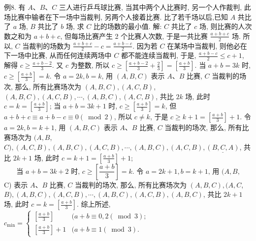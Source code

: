 例8. 有 $A 、 B 、 C$ 三人进行乒乓球比赛, 当其中两个人比赛时, 另一个人作裁判, 此场比赛中输者在下一场中当裁判, 另两个人接着比赛.
比了若千场以后,已知 $A$ 共比了 $a$ 场, $B$ 共比了 $b$ 场, 求 $C$ 比的场数的最小值.
解: $C$ 共比了 $c$ 场, 则比赛的人次数之和为 $a+b+c$, 但每场比赛产生 2 个比赛人次数, 于是一共比赛 $\frac{a+b+c}{2}$ 场.
所以, $C$ 当裁判的场数为 $\frac{a+b+c}{2}-c=\frac{a+b-c}{2}$.
因为若 $C$ 在某场中当裁判, 则他必在下一场中比赛, 从而任何连续两场中 $C$ 都不能连续当裁判, 于是, $\frac{a+b-c}{2} \leqslant c+1$, 解得 $c \geqslant \frac{a+b-2}{3}$.
又 $c$ 为整数, 所以 $c \geqslant\left[\frac{a+b-2}{3}+\frac{2}{3}\right]=\left[\frac{a+b}{3}\right]$.
当 $a+b=3 k$ 时, $c \geqslant\left[\frac{a+b}{3}\right]=k$. 令 $a=2 k, b=k$, 用 $(A, B, C)$ 表示 $A 、 B$ 比赛, $C$ 当裁判的场次, 那么, 所有比赛场次为 $(A, B, C),(A, C, B)$, $(A, B, C),(A, C, B), \cdots,(A, B, C),(A, C, B)$, 共比 $2 k$ 场, 此时 $c=k=\left[\frac{a+b}{3}\right]$;
当 $a+b=3 k+1$ 时, $c \geqslant\left[\frac{a+b}{3}\right]=k$, 但 $a+b+c \equiv a+b-c \equiv 0(\bmod 2)$, 所以 $c \neq k$, 于是 $c \geqslant k+1=\left[\frac{a+b}{3}\right]+1$. 令 $a=2 k, b=k+1$, 用 $(A, B, C)$ 表示 $A 、 B$ 比赛, $C$ 当裁判的场次, 那么, 所有比赛场次为 $(A, B$, $C),(A, C, B),(A, B, C),(A, C, B), \cdots,(A, B, C),(A, C, B), \underline{(B,C, A)}$,
共比 $2 k+1$ 场, 此时 $c=k+1=\left[\frac{a+b}{3}\right]+1$;
$$
\text { 当 } a+b=3 k+2 \text { 时, } c \geqslant\left[\frac{a+b}{3}\right]=k \text {. 令 } a=2 k+1, b=k+1 \text {, 用 }(A, B \text {, }
$$
C) 表示 $A 、 B$ 比赛, $C$ 当裁判的场次, 那么, 所有比赛场次为 $(A, B, C),(A, C$, $B),(A, B, C),(A, C, B), \cdots,(A, B, C),(A, C, B),(A, B, C)$, 共比 $2 k+1$ 场, 此时 $c=k=\left[\frac{a+b}{3}\right]$.
综上所述, $c_{\min }= \begin{cases}{\left[\frac{a+b}{3}\right]} & (a+b \equiv 0,2(\bmod 3) ; \\ {\left[\frac{a+b}{3}\right]+1} & (a+b \equiv 1(\bmod 3) .\end{cases}$



